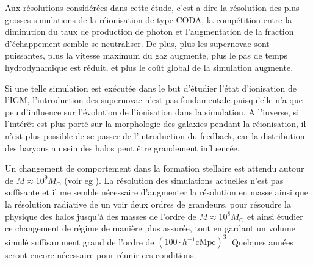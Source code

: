 Aux résolutions considérées dans cette étude, c'est a dire la résolution des plus grosses simulations de la réionisation de type CODA,  %
la compétition entre la diminution du taux de production de photon et l'augmentation de la fraction d'échappement semble se neutraliser.
De plus, plus les supernovae sont puissantes, plus la vitesse maximum du gaz augmente, plus le pas de temps hydrodynamique est réduit, et plus le coût global de la simulation augmente.

Si une telle simulation est exécutée dans le but d'étudier l'état d'ionisation de l'\ac{IGM}, l'introduction des supernovae n'est pas fondamentale puisqu'elle n'a que peu d'influence sur l'évolution de l'ionisation dans la simulation.
A l'inverse, si l’intérêt est plus porté sur la morphologie des galaxies pendant la réionisation, il n'est plus possible de se passer de l'introduction du feedback, car la distribution des baryons au sein des halos peut être grandement influencée.


Un changement de comportement dans la formation stellaire est attendu autour de $M \approx 10^9M_\odot$ (voir eg \cite{2001PhR...349..125B}).
La résolution des simulations actuelles n'est pas suffisante et il me semble nécessaire d'augmenter la résolution en masse ainsi que la résolution radiative de un voir deux ordres de grandeurs, pour résoudre la physique des halos jusqu'à des masses de l'ordre de $M \approx 10^8M_\odot$ et ainsi étudier ce changement de régime de manière plus assurée, tout en gardant un volume simulé suffisamment grand de l'ordre de $\left( 100 \cdot h^{-1} \mathrm{cMpc} \right)^3$.
Quelques années seront encore nécessaire pour réunir ces conditions.







